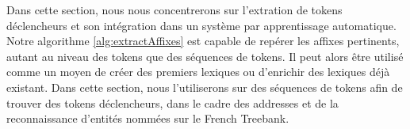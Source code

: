 \documentclass[PhD-Yoann-Dupont.tex]{subfiles}
\begin{document}
\begin{comment}
Dans la continuité de l'article EGC \citep{dupont2016extraction} :
\begin{itemize}
    \item sous-séquences deviennent des chaînes de tokens $\implies$ extraction de triggers
    \item attribution de score
    \item générer des dictionnaires et créer des taxonomies
    \item gestion de l'ambiguïté (même chose reconnue par plusieurs dictionnaires)
    \item comparer avec fouille de motifs \citep{holat2016fouille,cellier2010fouille}. Intégration de "règles" dans un CRF.
    \item cas des adresses (en cours)
    \item intégrer dans Quaero (features à la \citet{raymond2013robust})
\end{itemize}
\end{comment}

Dans cette section, nous nous concentrerons sur l'extration de tokens déclencheurs et son intégration dans un système par apprentissage automatique. Notre algorithme \ref{alg:extractAffixes} est capable de repérer les affixes pertinents, autant au niveau des tokens que des séquences de tokens. Il peut alors être utilisé comme un moyen de créer des premiers lexiques ou d'enrichir des lexiques déjà existant. Dans cette section, nous l'utiliserons sur des séquences de tokens afin de trouver des tokens déclencheurs, dans le cadre des addresses et de la reconnaissance d'entités nommées sur le French Treebank.
\end{document}
